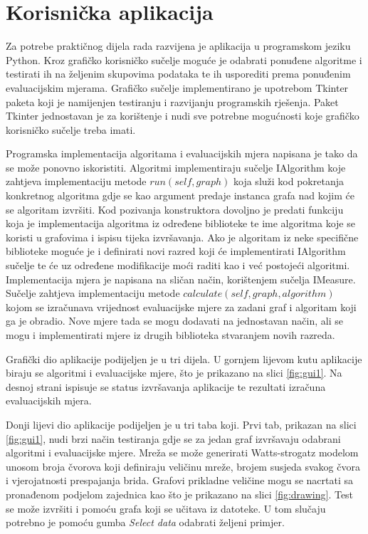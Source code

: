 \section{Korisnička aplikacija}

Za potrebe praktičnog dijela rada razvijena je aplikacija u programskom jeziku Python. Kroz grafičko korisničko sučelje moguće je odabrati ponuđene algoritme i testirati ih na željenim skupovima podataka te ih usporediti prema ponuđenim evaluacijskim mjerama. Grafičko sučelje implementirano je upotrebom Tkinter paketa koji je namijenjen testiranju i razvijanju programskih rješenja. Paket Tkinter jednostavan je za korištenje i nudi sve potrebne mogućnosti koje grafičko korisničko sučelje treba imati.

Programska implementacija algoritama i evaluacijskih mjera napisana je tako da se može ponovno iskoristiti. Algoritmi implementiraju sučelje IAlgorithm koje zahtjeva implementaciju metode $run(self, graph)$ koja služi kod pokretanja konkretnog algoritma gdje se kao argument predaje instanca grafa nad kojim će se algoritam izvršiti. Kod pozivanja konstruktora dovoljno je predati funkciju koja je implementacija algoritma iz određene biblioteke te ime algoritma koje se koristi u grafovima i ispisu tijeka izvršavanja. Ako je algoritam iz neke specifične biblioteke moguće je i definirati novi razred koji će implementirati IAlgorithm sučelje te će uz određene modifikacije moći raditi kao i već postojeći algoritmi. Implementacija mjera je napisana na sličan način, korištenjem sučelja IMeasure. Sučelje zahtjeva implementaciju metode $calculate(self, graph, algorithm)$ kojom se izračunava vrijednost evaluacijske mjere za zadani graf i algoritam koji ga je obradio. Nove mjere tada se mogu dodavati na jednostavan način, ali se mogu i implementirati mjere iz drugih biblioteka stvaranjem novih razreda.

Grafički dio aplikacije podijeljen je u tri dijela. U gornjem lijevom kutu aplikacije biraju se algoritmi i evaluacijske mjere, što je prikazano na slici \ref{fig:gui1}. Na desnoj strani ispisuje se status izvršavanja aplikacije te rezultati izračuna evaluacijskih mjera.

Donji lijevi dio aplikacije podijeljen je u tri taba koji. Prvi tab, prikazan na slici \ref{fig:gui1}, nudi brzi način testiranja gdje se za jedan graf izvršavaju odabrani algoritmi i evaluacijske mjere. Mreža se može generirati Watts-strogatz modelom unosom broja čvorova koji definiraju veličinu mreže, brojem susjeda svakog čvora i vjerojatnosti prespajanja brida. Grafovi prikladne veličine mogu se nacrtati sa pronađenom podjelom zajednica kao što je prikazano na slici \ref{fig:drawing}. Test se može izvršiti i pomoću grafa koji se učitava iz datoteke. U tom slučaju potrebno je pomoću gumba \textit{Select data} odabrati željeni primjer.


